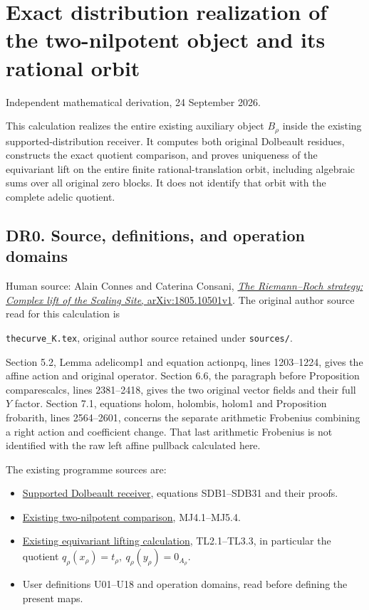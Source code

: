 \section{Exact distribution realization of the two-nilpotent object and
its rational
orbit}\label{exact-distribution-realization-of-the-two-nilpotent-object-and-its-rational-orbit}

Independent mathematical derivation, 24 September 2026.

This calculation realizes the entire existing auxiliary object
\(B_\rho\) inside the existing supported-distribution receiver. It
computes both original Dolbeault residues, constructs the exact quotient
comparison, and proves uniqueness of the equivariant lift on the entire
finite rational-translation orbit, including algebraic sums over all
original zero blocks. It does not identify that orbit with the complete
adelic quotient.

\subsection{DR0. Source, definitions, and operation
domains}\label{dr0.-source-definitions-and-operation-domains}

Human source: Alain Connes and Caterina Consani,
\href{https://arxiv.org/abs/1805.10501v1}{\emph{The Riemann--Roch
strategy: Complex lift of the Scaling Site}, arXiv:1805.10501v1}. The
original author source read for this calculation is

\nolinkurl{thecurve_K.tex}, original author source retained under
\texttt{sources/}.

Section 5.2, Lemma adelicomp1 and equation actionpq, lines 1203--1224,
gives the affine action and original operator. Section 6.6, the
paragraph before Proposition comparescalcs, lines 2381--2418, gives the
two original vector fields and their full \(Y\) factor. Section 7.1,
equations holom, holombis, holom1 and Proposition frobarith, lines
2564--2601, concerns the separate arithmetic Frobenius combining a right
action and coefficient change. That last arithmetic Frobenius is not
identified with the raw left affine pullback calculated here.

The existing programme sources are:

\begin{itemize}
\tightlist
\item
  \href{../independent/CC_SUPPORTED_DOLBEAULT_BOUNDARY.tex}{Supported
  Dolbeault receiver}, equations SDB1--SDB31 and their proofs.
\item
  \href{../deligne_quotient_weight_20260924/MONODROMY_JET_COMPARISON.md}{Existing
  two-nilpotent comparison}, MJ4.1--MJ5.4.
\item
  \href{TAU_LIFTING_AND_WEIGHT_SEPARATION.md}{Existing equivariant
  lifting calculation}, TL2.1--TL3.3, in particular the quotient
  \(q_\rho(x_\rho)=t_\rho,\ q_\rho(y_\rho)=0_{A_\rho}\).
\item
  {User
  definitions U01--U18} and
  {operation domains}, read before
  defining the present maps.
\end{itemize}

